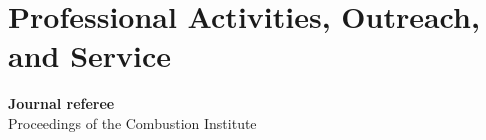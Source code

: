 \section{\sc Professional Activities, Outreach, and Service}

{\bf Journal referee}
\vspace*{.05in}\\
\hspace*{1em}
Proceedings of the Combustion Institute
